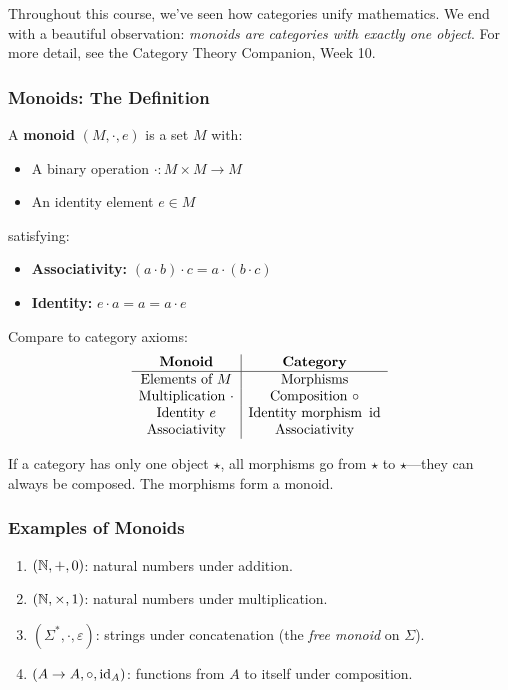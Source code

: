 \begin{goingdeeper}
Throughout this course, we've seen how categories unify mathematics. We end with a beautiful observation: \emph{monoids are categories with exactly one object}.
For more detail, see the Category Theory Companion, Week 10.

\subsubsection*{Monoids: The Definition}

A \textbf{monoid} $(M, \cdot, e)$ is a set $M$ with:
\begin{itemize}
  \item A binary operation $\cdot : M \times M \to M$
  \item An identity element $e \in M$
\end{itemize}
satisfying:
\begin{itemize}
  \item \textbf{Associativity:} $(a \cdot b) \cdot c = a \cdot (b \cdot c)$
  \item \textbf{Identity:} $e \cdot a = a = a \cdot e$
\end{itemize}

Compare to category axioms:
\[
\begin{array}{c|c}
\textbf{Monoid} & \textbf{Category} \\
\hline
\text{Elements of } M & \text{Morphisms} \\
\text{Multiplication } \cdot & \text{Composition } \circ \\
\text{Identity } e & \text{Identity morphism } \operatorname{id} \\
\text{Associativity} & \text{Associativity}
\end{array}
\]

If a category has only one object $\star$, all morphisms go from $\star$ to $\star$---they can always be composed. The morphisms form a monoid.

\subsubsection*{Examples of Monoids}

\begin{enumerate}
  \item $(\mathbb{N}, +, 0)$: natural numbers under addition.
  \item $(\mathbb{N}, \times, 1)$: natural numbers under multiplication.
  \item $(\Sigma^*, \cdot, \varepsilon)$: strings under concatenation (the \emph{free monoid} on $\Sigma$).
  \item $(A \to A, \circ, \operatorname{id}_A)$: functions from $A$ to itself under composition.
\end{enumerate}


\end{goingdeeper}
